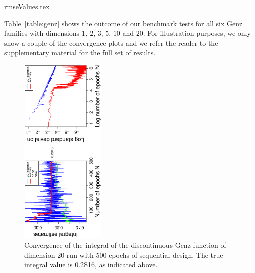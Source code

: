 

{rmseValues.tex}

Table~\ref{table:genz} shows the outcome of our benchmark tests for all six Genz families with dimensions $1$, $2$, $3$, $5$, $10$ and $20$. For illustration purposes, we only show a couple of the convergence plots and we refer the reader to the supplementary material for the full set of results. 

\begin{figure}[!t]
    \centering
    \vspace*{-12mm}
    \includegraphics[width = 0.36\textwidth, angle = -90]{../../report/Figures/3/convergenceMean320Dimensions.eps}
    \vspace*{-10mm}
    \caption{Convergence of the integral of the discontinuous Genz function of dimension 20 run with 500 epochs of sequential design. The true integral value is 0.2816, as indicated above.}
    \label{fig:genz2}
    \vspace*{-1mm}
\end{figure}

